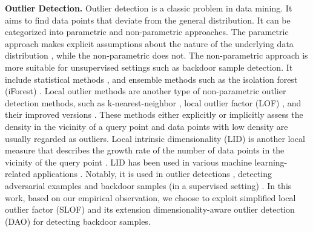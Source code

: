 \noindent\textbf{Outlier Detection.}
Outlier detection is a classic problem in data mining. It aims to find data points that deviate from the general distribution. It can be categorized into parametric and non-parametric approaches. The parametric approach makes explicit assumptions about the nature of the underlying data distribution \citep{yang2009outlier,satman2013new}, while the non-parametric does not. 
The non-parametric approach is more suitable for unsupervised settings such as backdoor sample detection. 
It include statistical methods \citep{goldstein2012histogram,li2022ecod}, and ensemble methods \citep{lazarevic2005feature,zhao2021suod} such as the isolation forest (iForest) \citep{liu2008isolation}. 
Local outlier methods are another type of non-parametric outlier detection methods, such as k-nearest-neighbor \citep{ramaswamy2000efficient}, local outlier factor (LOF) \citep{breunig2000lof}, and their improved versions \citep{tang2002enhancing,papadimitriou2003loci,latecki2007outlier,kriegel2008angle}. 
These methods either explicitly or implicitly assess the density in the vicinity of a query point \citep{campos2016evaluation} and data points with low density are usually regarded as outliers. 
 Local intrinsic dimensionality (LID) is another local measure that describes the growth rate of the number of data points in the vicinity of the query point \citep{levina2004maximum,houle2017local1}. LID has been used in various machine learning-related applications \citep{gong2019intrinsic,ansuini2019intrinsic,pope2021the}. Notably, it is used in outlier detections \citep{houle2018correlation}, detecting adversarial examples \citep{ma2018characterizing} and backdoor samples (in a supervised setting) \citep{dolatabadi2022collider}. 
In this work, based on our empirical observation, we choose to exploit simplified local outlier factor (SLOF) \citep{schubert2014local} and its extension dimensionality-aware outlier detection (DAO) \citep{anderberg2024dimensionality} 
for detecting backdoor samples.